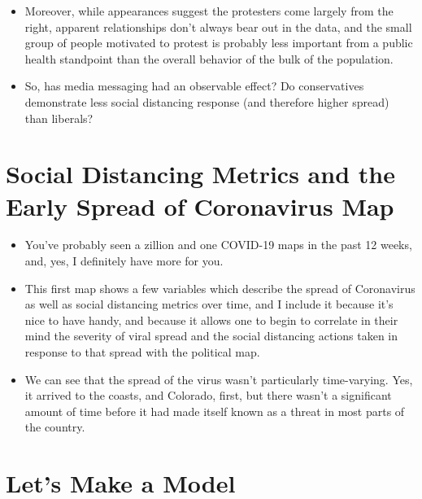 \documentclass{article}
\begin{document}
\begin{itemize}
	\item Moreover, while appearances suggest the protesters come largely from the right, apparent relationships don't always bear out in the data, and the small group of people motivated to protest is probably less important from a public health standpoint than the overall behavior of the bulk of the population.  
	\item So, has media messaging had an observable effect? Do conservatives demonstrate less social distancing response (and therefore higher spread) than liberals? 
\end{itemize}

\section{Social Distancing Metrics and the Early Spread of Coronavirus Map}

\begin{itemize}
	\item You've probably seen a zillion and one COVID-19 maps in the past 12 weeks, and, yes, I definitely have more for you. 
	\item This first map shows a few variables which describe the spread of Coronavirus as well as social distancing metrics over time, and I include it because it's nice to have handy, and because it allows one to begin to correlate in their mind the severity of viral spread and the social distancing actions taken in response to that spread with the political map.
	\item We can see that the spread of the virus wasn't particularly time-varying. Yes, it arrived to the coasts, and Colorado, first, but there wasn't a significant amount of time before it had made itself known as a threat in most parts of the country. 
\end{itemize}

\section{Let's Make a Model}
\end{document}
